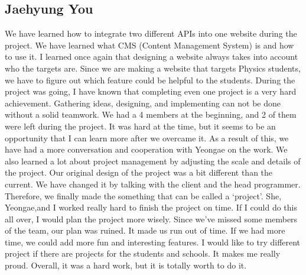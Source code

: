 \documentclass[10pt]{article}
\begin{document}
    \subsection{Jaehyung You}
        We have learned how to integrate two different APIs into one website during the project.
        We have learned what CMS (Content Management System) is and how to use it. I learned once again that designing a website always takes into account who the targets are. Since we are making a website that targets Physics students, we have to figure out which feature could be helpful to the students. During the project was going, I have known that completing even one project is a very hard achievement. Gathering ideas, designing, and implementing can not be done without a solid teamwork. We had a 4 members at the beginning, and 2 of them were left during the project. It was hard at the time, but it seems to be an opportunity that I can learn more after we overcame it. As a result of this, we have had a more conversation and cooperation with Yeongae on the work. We also learned a lot about project management by adjusting the scale and details of the project. Our original design of the project was a bit different than the current. We have changed it by talking with the client and the head programmer. Therefore, we finally made the something that can be called a ‘project’.  She, Yeongae,and I worked really hard to finish the project on time. If I could do this all over, I would plan the project more wisely. Since we’ve missed some members of the team, our plan was ruined. It made us run out of time. If we had more time, we could add more fun and interesting features. I would like to try different project if there are projects for the students and schools. It makes me really proud. Overall, it was a hard work, but it is totally worth to do it.

\newpage
\end{document}
